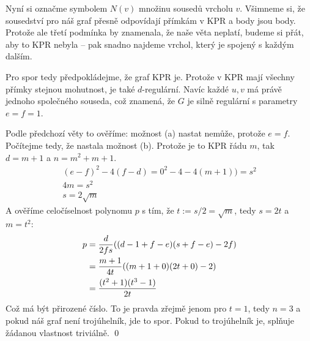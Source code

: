 Nyní si označme symbolem $N(v)$ množinu sousedů vrcholu $v$. Všimneme si, že
sousedství pro náš graf přesně odpovídají přímkám v KPR a body jsou body. Protože ale třetí
podmínka by znamenala, že naše věta neplatí, budeme si přát, aby to KPR nebyla
-- pak snadno najdeme vrchol, který je spojený s každým dalším.

Pro spor tedy předpokládejme, že graf KPR je. Protože v KPR mají všechny přímky stejnou mohutnost, je také $d$-regulární. Navíc každé $u,v$ má právě jednoho společného souseda, což znamená, že $G$ je silně regulární s parametry  $e=f=1$.

Podle předchozí věty to ověříme: možnost (a) nastat nemůže, protože $e=f$.
Počítejme tedy, že nastala možnost (b). Protože je to KPR řádu $m$, tak $d=m+1$ a $n=m^2 + m + 1$.
\begin{align}
	(e-f)^2 - 4(f-d) = 0^2 - 4 - 4(m+1))= s^2 \\
	4m = s^2 \\
	s=2\sqrt m 
\end{align}
A ověříme celočíselnost polynomu $p$ s tím, že $t:=s/2=\sqrt m$, tedy $s=2t$ a $m=t^2$:
\begin{align}
	p &= {d \over 2fs} ((d-1+f-e)(s+f-e)-2f) \\
	&= {m+1 \over 4t} ((m+1+0)(2t+0)-2)\\
	&= {(t^2 + 1)(t^3-1) \over 2t}
\end{align}
Což má být přirozené číslo. To je pravda zřejmě jenom pro $t=1$, tedy $n=3$ a pokud náš graf není trojúhelník, jde to spor. Pokud to trojúhelník je, splňuje žádanou vlastnost triviálně. \qed


